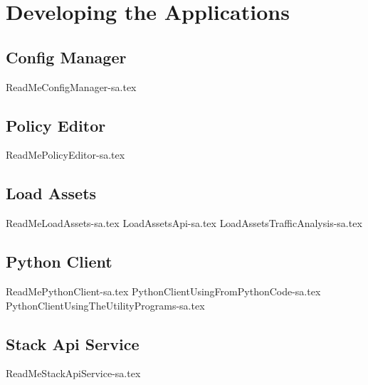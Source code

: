
\chapter{Developing the Applications}
\label{intro04} %


\section{Config Manager}
{ReadMeConfigManager-sa.tex}

\section{Policy Editor}
{ReadMePolicyEditor-sa.tex}

\section{Load Assets}
{ReadMeLoadAssets-sa.tex}
{LoadAssetsApi-sa.tex}
{LoadAssetsTrafficAnalysis-sa.tex}

\section{Python Client}
{ReadMePythonClient-sa.tex}
{PythonClientUsingFromPythonCode-sa.tex}
{PythonClientUsingTheUtilityPrograms-sa.tex}

\section{Stack Api Service}
{ReadMeStackApiService-sa.tex}

